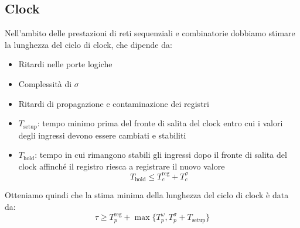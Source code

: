 \subsection{Clock}
Nell'ambito delle prestazioni di reti sequenziali e combinatorie dobbiamo stimare la lunghezza del ciclo di clock, che dipende da:
\begin{itemize}
	\item Ritardi nelle porte logiche
	\item Complessità di $\sigma$
	\item Ritardi di propagazione e contaminazione dei registri
	\item $T_{\text{setup}}$: tempo minimo prima del fronte di salita del clock entro cui i valori degli ingressi devono essere cambiati e stabiliti
	\item $T_{\text{hold}}$: tempo in cui rimangono stabili gli ingressi dopo il fronte di salita del clock affinché il registro riesca a registrare il nuovo valore
	\begin{equation}
		T_{\text{hold}} \leq T_c^{\text{reg}} + T_c^\sigma
	\end{equation}
\end{itemize}

Otteniamo quindi che la stima minima della lunghezza del ciclo di clock è data da:
\begin{equation}
	\tau \geq T_p^{\text{reg}} + \max\{T_p^\omega, T_p^\sigma+T_{\text{setup}}\}
\end{equation}